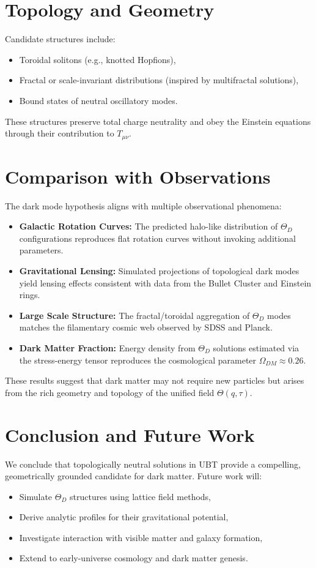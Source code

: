\section{Topology and Geometry}
Candidate structures include:
\begin{itemize}
  \item Toroidal solitons (e.g., knotted Hopfions),
  \item Fractal or scale-invariant distributions (inspired by multifractal solutions),
  \item Bound states of neutral oscillatory modes.
\end{itemize}

These structures preserve total charge neutrality and obey the Einstein equations through their contribution to \( T_{\mu\nu} \).

\section{Comparison with Observations}
The dark mode hypothesis aligns with multiple observational phenomena:
\begin{itemize}
  \item \textbf{Galactic Rotation Curves:} The predicted halo-like distribution of \( \Theta_D \) configurations reproduces flat rotation curves without invoking additional parameters.
  \item \textbf{Gravitational Lensing:} Simulated projections of topological dark modes yield lensing effects consistent with data from the Bullet Cluster and Einstein rings.
  \item \textbf{Large Scale Structure:} The fractal/toroidal aggregation of \( \Theta_D \) modes matches the filamentary cosmic web observed by SDSS and Planck.
  \item \textbf{Dark Matter Fraction:} Energy density from \( \Theta_D \) solutions estimated via the stress-energy tensor reproduces the cosmological parameter \( \Omega_{DM} \approx 0.26 \).
\end{itemize}

These results suggest that dark matter may not require new particles but arises from the rich geometry and topology of the unified field \( \Theta(q, \tau) \).

\section{Conclusion and Future Work}
We conclude that topologically neutral solutions in UBT provide a compelling, geometrically grounded candidate for dark matter. Future work will:
\begin{itemize}
  \item Simulate \( \Theta_D \) structures using lattice field methods,
  \item Derive analytic profiles for their gravitational potential,
  \item Investigate interaction with visible matter and galaxy formation,
  \item Extend to early-universe cosmology and dark matter genesis.
\end{itemize}


